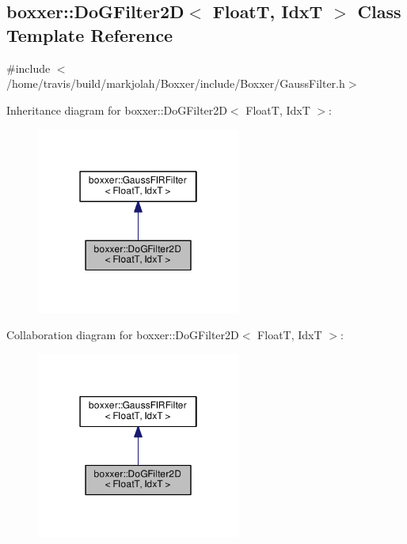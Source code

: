 \hypertarget{classboxxer_1_1DoGFilter2D}{}\subsection{boxxer\+:\+:Do\+G\+Filter2D$<$ FloatT, IdxT $>$ Class Template Reference}
\label{classboxxer_1_1DoGFilter2D}


{\ttfamily \#include $<$/home/travis/build/markjolah/\+Boxxer/include/\+Boxxer/\+Gauss\+Filter.\+h$>$}



Inheritance diagram for boxxer\+:\+:Do\+G\+Filter2D$<$ FloatT, IdxT $>$\+:\nopagebreak
\begin{figure}[H]
\begin{center}
\leavevmode
\includegraphics[width=190pt]{classboxxer_1_1DoGFilter2D__inherit__graph}
\end{center}
\end{figure}


Collaboration diagram for boxxer\+:\+:Do\+G\+Filter2D$<$ FloatT, IdxT $>$\+:\nopagebreak
\begin{figure}[H]
\begin{center}
\leavevmode
\includegraphics[width=190pt]{classboxxer_1_1DoGFilter2D__coll__graph}
\end{center}
\end{figure}
